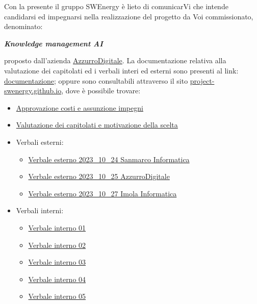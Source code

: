 Con la presente il gruppo SWEnergy è lieto di comunicarVi che intende candidarsi
ed impegnarsi nella realizzazione del progetto da Voi commissionato, denominato:

\begin{center}
\textbf{\textit{Knowledge management AI}}
\end{center}

proposto dall’azienda \href{https://www.azzurrodigitale.com/}{AzzurroDigitale}. 
La documentazione relativa alla valutazione dei capitolati ed i verbali
interi ed esterni sono presenti al link:
\href{https://github.com/Project-SWEnergy/documentazione}{documentazione};
oppure sono consultabili attraverso il sito 
\href{https://project-swenergy.github.io/}{project-swenergy.github.io},
dove è possibile trovare:

\begin{itemize}
	\item \href{%
			}{Approvazione costi e assunzione impegni}

	\item \href{%
			}{Valutazione dei capitolati e motivazione della scelta}
	
	\item Verbali esterni:
		\begin{itemize}
			\item \href{%
					}{Verbale esterno 2023\_10\_24 Sanmarco Informatica}
			\item \href{%
					}{Verbale esterno 2023\_10\_25 AzzurroDigitale}
			\item \href{%
					}{Verbale esterno 2023\_10\_27 Imola Informatica}
		\end{itemize}

	\item Verbali interni:
		\begin{itemize}
			\item \href{%
					}{Verbale interno 01}
			\item \href{%
					}{Verbale interno 02}
			\item \href{%
					}{Verbale interno 03}
			\item \href{%
					}{Verbale interno 04}
			\item \href{%
					}{Verbale interno 05}
		\end{itemize}
\end{itemize}


